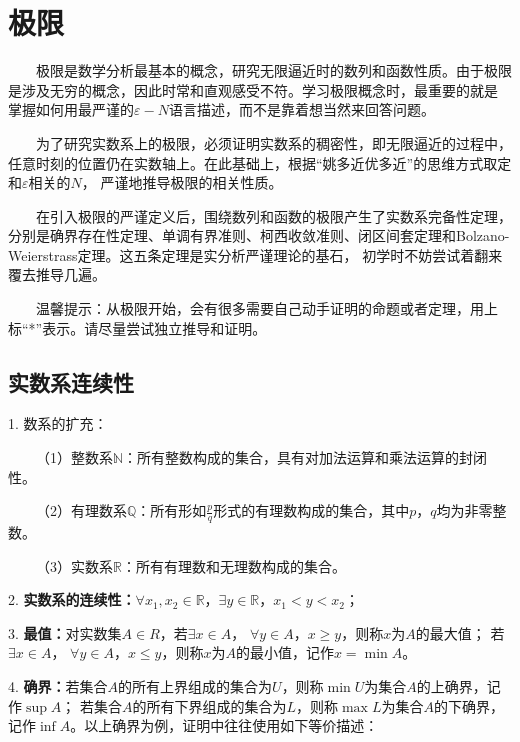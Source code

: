\section{极限}

\begin{tcolorbox}[colback=red!5,colframe=red!75!black]
    ~~~~极限是数学分析最基本的概念，研究无限逼近时的数列和函数性质。由于极限是涉及无穷的概念，因此时常和直观感受不符。学习极限概念时，最重要的就是
    掌握如何用最严谨的$\varepsilon-N$语言描述，而不是靠着想当然来回答问题。

    ~~~~为了研究实数系上的极限，必须证明实数系的稠密性，即无限逼近的过程中，任意时刻的位置仍在实数轴上。在此基础上，根据“姚多近优多近”的思维方式取定和$\varepsilon$相关的$N$，
    严谨地推导极限的相关性质。

    ~~~~在引入极限的严谨定义后，围绕数列和函数的极限产生了实数系完备性定理，分别是确界存在性定理、单调有界准则、柯西收敛准则、闭区间套定理和Bolzano-Weierstrass定理。这五条定理是实分析严谨理论的基石，
    初学时不妨尝试着翻来覆去推导几遍。

    ~~~~温馨提示：从极限开始，会有很多需要自己动手证明的命题或者定理，用上标“*”表示。请尽量尝试独立推导和证明。

\end{tcolorbox}

\subsection{实数系连续性}

1. 数系的扩充：

~~~~（1）整数系$\mathbb{N}$：所有整数构成的集合，具有对加法运算和乘法运算的封闭性。

~~~~（2）有理数系$\mathbb{Q}$：所有形如$\frac{p}{q}$形式的有理数构成的集合，其中$p$，$q$均为非零整数。

~~~~（3）实数系$\mathbb{R}$：所有有理数和无理数构成的集合。

2. \textbf{实数系的连续性：}$\forall x_1,x_2\in \mathbb{R}$，$\exists y \in \mathbb{R}$，$x_1<y<x_2$；

3. \textbf{最值：}对实数集$A \in R$，若$\exists x \in A$， $\forall y \in A$，$x \geqslant y$，则称$x$为$A$的最大值；
若$\exists x \in A$， $\forall y \in A$，$x \leqslant y$，则称$x$为$A$的最小值，记作$x = \min A$。

4. \textbf{确界：}若集合$A$的所有上界组成的集合为$U$，则称$\min U$为集合$A$的上确界，记作$\sup A$；
若集合$A$的所有下界组成的集合为$L$，则称$\max L$为集合$A$的下确界，记作$\inf A$。以上确界为例，证明中往往使用如下等价描述：

